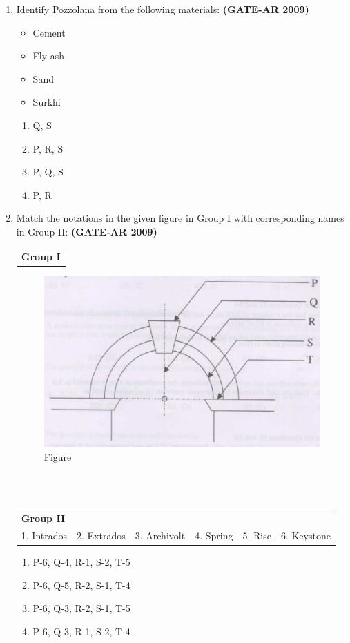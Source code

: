 \documentclass[a4paper,10pt]{article}
\begin{document}
\begin{enumerate}
    \item Identify Pozzolana from the following materials: \hfill \textbf{(GATE-AR 2009)}
    \begin{itemize}
        \item Cement
        \item Fly-ash
        \item Sand
        \item Surkhi
    \end{itemize}
    \begin{multicols}{2}
	\begin{enumerate}
        \item Q, S
        \item P, R, S
        \item P, Q, S
        \item P, R
    \end{enumerate}
	\end{multicols}

	\item Match the notations in the given figure in Group I with corresponding names in Group II: \hfill \textbf{(GATE-AR 2009)} \\
    \begin{tabular}{ l }
	\textbf{Group I} \\
	\end{tabular}
	\begin{figure}[h!]
        \centering
        \includegraphics[width=0.5\linewidth]{figs/img_04.jpg}
	\caption{Figure}
	\label{fig:4}
    \end{figure} \\
     \\
    \begin{tabular}{ l l l l l l }
	\textbf{Group II} & & & & & \\
	1. Intrados & 2. Extrados & 3. Archivolt & 4. Spring & 5. Rise & 6. Keystone \\
	\end{tabular}	
	\begin{enumerate}
        \item P-6, Q-4, R-1, S-2, T-5
        \item P-6, Q-5, R-2, S-1, T-4
        \item P-6, Q-3, R-2, S-1, T-5
        \item P-6, Q-3, R-1, S-2, T-4
    \end{enumerate}


\end{enumerate}
\end{document}
